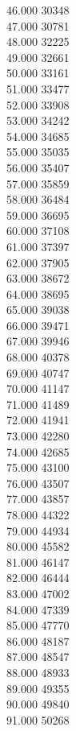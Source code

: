 { 46.000	30348 \\
 47.000	30781 \\
 48.000	32225 \\
 49.000	32661 \\
 50.000	33161 \\
 51.000	33477 \\
 52.000	33908 \\
 53.000	34242 \\
 54.000	34685 \\
 55.000	35035 \\
 56.000	35407 \\
 57.000	35859 \\
 58.000	36484 \\
 59.000	36695 \\
 60.000	37108 \\
 61.000	37397 \\
 62.000	37905 \\
 63.000	38672 \\
 64.000	38695 \\
 65.000	39038 \\
 66.000	39471 \\
 67.000	39946 \\
 68.000	40378 \\
 69.000	40747 \\
 70.000	41147 \\
 71.000	41489 \\
 72.000	41941 \\
 73.000	42280 \\
 74.000	42685 \\
 75.000	43100 \\
 76.000	43507 \\
 77.000	43857 \\
 78.000	44322 \\
 79.000	44934 \\
 80.000	45582 \\
 81.000	46147 \\
 82.000	46444 \\
 83.000	47002 \\
 84.000	47339 \\
 85.000	47770 \\
 86.000	48187 \\
 87.000	48547 \\
 88.000	48933 \\
 89.000	49355 \\
 90.000	49840 \\
 91.000	50268 \\
}
